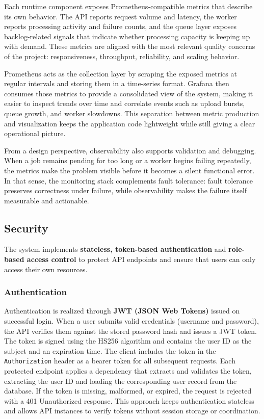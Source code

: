 \documentclass{scrartcl}
\begin{document}
Each runtime component exposes Prometheus-compatible metrics that describe its own behavior.
The API reports request volume and latency, the worker reports processing activity and failure counts, and the queue layer exposes backlog-related signals that indicate whether processing capacity is keeping up with demand.
These metrics are aligned with the most relevant quality concerns of the project: responsiveness, throughput, reliability, and scaling behavior.

Prometheus acts as the collection layer by scraping the exposed metrics at regular intervals and storing them in a time-series format.
Grafana then consumes those metrics to provide a consolidated view of the system, making it easier to inspect trends over time and correlate events such as upload bursts, queue growth, and worker slowdowns.
This separation between metric production and visualization keeps the application code lightweight while still giving a clear operational picture.

From a design perspective, observability also supports validation and debugging.
When a job remains pending for too long or a worker begins failing repeatedly, the metrics make the problem visible before it becomes a silent functional error.
In that sense, the monitoring stack complements fault tolerance: fault tolerance preserves correctness under failure, while observability makes the failure itself measurable and actionable.

\subsection{Security}\label{security}

The system implements \textbf{stateless, token-based authentication} and \textbf{role-based access control} to protect API endpoints and ensure that users can only access their own resources.

\subsubsection*{Authentication}

Authentication is realized through \textbf{JWT (JSON Web Tokens)} issued on successful login.
When a user submits valid credentials (username and password), the API verifies them against the stored password hash and issues a JWT token.
The token is signed using the HS256 algorithm and contains the user ID as the subject and an expiration time.
The client includes the token in the \texttt{Authorization} header as a bearer token for all subsequent requests.
Each protected endpoint applies a dependency that extracts and validates the token, extracting the user ID and loading the corresponding user record from the database.
If the token is missing, malformed, or expired, the request is rejected with a 401 Unauthorized response.
This approach keeps authentication stateless and allows API instances to verify tokens without session storage or coordination.
\end{document}
